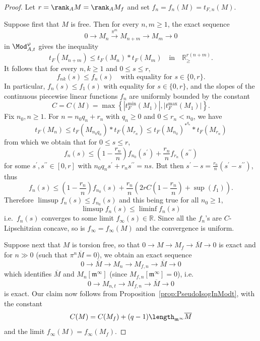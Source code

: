 \begin{proof}
Let $r=\rank_{A}M=\rank_{A}M_{f}$ and set $f_{n}=f_{n}(M)=t_{F,n}(M)$.

Suppose first that $M$ is free. Then for every $n,m\geq1$, the exact sequence
\[
0\rightarrow M_{n}\stackrel{\pi^{m}}{\longrightarrow}M_{n+m}\rightarrow M_{m}\rightarrow0
\]
in $\Mod_{A,t}^{\varphi}$ gives the inequality
\[
t_{F}(M_{n+m})\leq t_{F}(M_{n})\ast t_{F}(M_{m})\quad\text{in}\quad\mathbb{R}_{\geq}^{r(n+m)}.
\]
It follows that for every $n,k\geq1$ and $0\leq s\leq r$,
\[
f_{nk}(s)\leq f_{n}(s)\quad\text{with equality for }s\in\{0,r\}.
\]
In particular, $f_{n}(s)\leq f_{1}(s)$ with equality for $s\in\{0,r\}$, and the slopes of the continuous piecewise linear functions $f_{n}$ are uniformly bounded by the constant
\[
C=C(M)=\max\left\{ \left|t_{F}^{\min}(M_{1})\right|,\left|t_{F}^{\max}(M_{1})\right|\right\}.
\]
Fix $n_{0},n\geq1$. For $n=n_{0}q_{n}+r_{n}$ with $q_{n}\geq0$ and $0\leq r_{n}<n_{0}$, we have
\[
t_{F}(M_{n})\leq t_{F}(M_{n_{0}q_{n}})\ast t_{F}(M_{r_{n}})\leq t_{F}(M_{n_{0}})^{\ast^{q_{n}}}\ast t_{F}(M_{r_{n}})
\]
from which we obtain that for $0\leq s\leq r$,
\[
f_{n}(s)\leq\left(1-\frac{r_{n}}{n}\right)f_{n_{0}}(s^{\prime})+{\frac{r_{n}}{n}}f_{r_{n}}(s^{\prime\prime})
\]
for some $s^{\prime},s^{\prime\prime}\in[0,r]$ with $n_{0}q_{n}s^{\prime}+r_{n}s^{\prime\prime}=ns$. But then $s^{\prime}-s=\frac{r_{n}}{n}(s^{\prime}-s^{\prime\prime})$, thus
\[
f_{n}(s)\leq\left(1-\frac{r_{n}}{n}\right)f_{n_{0}}(s)+{\frac{r_{n}}{n}}\left(2rC\left(1-\frac{r_{n}}{n}\right)+\sup(f_{1})\right).
\]
Therefore $\limsup f_{n}(s)\leq f_{n_{0}}(s)$ and this being true for all $n_{0}\geq1$,
\[
\limsup f_{n}(s)\leq\liminf f_{n}(s)
\]
i.e.~$f_{n}(s)$ converges to some limit $f_{\infty}(s)\in\mathbb{R}$. Since all the $f_{n}$'s are $C$-Lipschitzian concave, so is $f_{\infty}=f_{\infty}(M)$ and the convergence is uniform.

Suppose next that $M$ is torsion free, so that $0\rightarrow M\rightarrow M_{f}\rightarrow\overline{M}\rightarrow0$ is exact and for $n\gg0$ (such that $\pi^{n}\overline{M}=0$), we obtain an exact sequence
\[
0\rightarrow\overline{M}\rightarrow M_{n}\rightarrow M_{f,n}\rightarrow\overline{M}\rightarrow0
\]
which identifies $\overline{M}$ and $M_{n}[\mathfrak{m}^{\infty}]$ (since $M_{f,n}[\mathfrak{m}^{\infty}]=0$), i.e.
\[
0\rightarrow M_{n,t}\rightarrow M_{f,n}\rightarrow\overline{M}\rightarrow0
\]
is exact. Our claim now follows from Proposition~\ref{prop:PseudoIsogInModt}, with the constant
\[
C(M)=C(M_{f})+(q-1)\length_{\mathfrak{m}^{\infty}}\overline{M}
\]
and the limit $f_{\infty}(M)=f_{\infty}(M_{f})$.


\end{proof}

